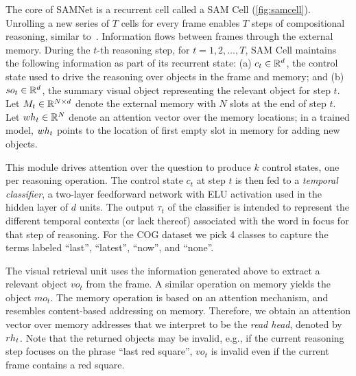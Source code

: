 The core of SAMNet is a recurrent cell called a SAM Cell (\cref{fig:samcell}). 
Unrolling a new series of $T$ cells for every frame enables $T$ steps of compositional
reasoning, similar to~\cite{hudson2018compositional}.
Information flows between frames through the external memory. 
During the $t$-th reasoning step, for $t=1,2, \dots, T$, SAM Cell maintains the following information as part of its recurrent state:
(a) $c_t \in \mathbb{R}^d$, the control state used to drive the reasoning over objects in the frame and memory; and
(b) $so_t  \in \mathbb{R}^d$, the summary visual object representing the relevant object for step $t$.
Let $M_t \in  \mathbb{R}^{N \times d}$ denote the external memory with $N$ slots at the end of step $t$.
Let $wh_t \in  \mathbb{R}^N$ denote an attention vector over the memory locations;
in a trained model, $wh_t$ points to the location of first empty slot in memory for adding new objects.   

This module drives attention over the question to produce $k$ control states, one per reasoning operation. 
The control state $c_t$ at step $t$ is then fed to a \emph{temporal classifier}, 
a two-layer feedforward network with ELU activation used in the hidden layer of $d$ units.
The output $\tau_t$ of the classifier is intended to represent the different temporal contexts (or lack thereof) associated with the word in focus for that step of reasoning.	
For the COG dataset we pick 4 classes to capture the terms labeled ``last'', ``latest'', ``now'', and ``none''.

The visual retrieval unit uses the information generated above to extract a relevant object $vo_t$ from the frame.
A similar operation on memory yields the object $mo_t$. The memory operation is based on an attention mechanism,
and resembles content-based addressing on memory. Therefore, we obtain an attention vector over memory addresses
that we interpret to be the \emph{read head}, denoted by $rh_t$.
Note that the returned objects may be invalid, 
e.g., if the current reasoning step focuses on the phrase ``last red square'', $vo_t$ is invalid 
even if the current frame contains a red square. 

